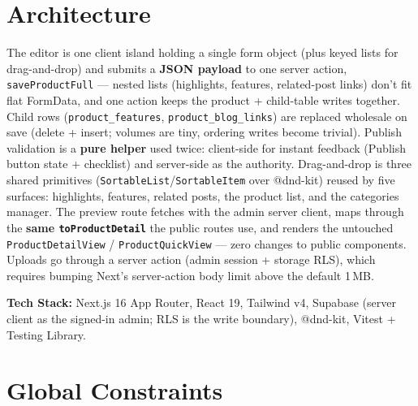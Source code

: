 \documentclass[11pt,a4paper]{article}
\begin{document}
\section{Architecture}

The editor is one client island holding a single form object (plus keyed lists for drag-and-drop) and
submits a \textbf{JSON payload} to one server action, \texttt{saveProductFull} --- nested lists
(highlights, features, related-post links) don't fit flat FormData, and one action keeps the product +
child-table writes together. Child rows (\texttt{product\_features}, \texttt{product\_blog\_links}) are
replaced wholesale on save (delete + insert; volumes are tiny, ordering writes become trivial). Publish
validation is a \textbf{pure helper} used twice: client-side for instant feedback (Publish button state +
checklist) and server-side as the authority. Drag-and-drop is three shared primitives
(\texttt{SortableList}/\texttt{SortableItem} over @dnd-kit) reused by five surfaces: highlights, features,
related posts, the product list, and the categories manager. The preview route fetches with the admin
server client, maps through the \textbf{same \texttt{toProductDetail}} the public routes use, and renders
the untouched \texttt{ProductDetailView} / \texttt{ProductQuickView} --- zero changes to public
components. Uploads go through a server action (admin session + storage RLS), which requires bumping
Next's server-action body limit above the default 1\,MB.

\textbf{Tech Stack:} Next.js 16 App Router, React 19, Tailwind v4, Supabase (server client as the
signed-in admin; RLS is the write boundary), @dnd-kit, Vitest + Testing Library.

\section{Global Constraints}
\end{document}
